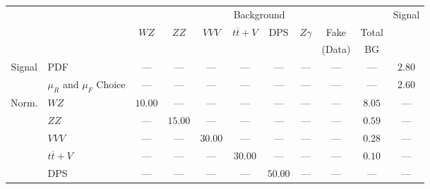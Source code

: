 \small\renewcommand{\tabcolsep}{4pt}
\begin{tabular}{|cl||ccccccc|c||c|}
\hline
 & & \multicolumn{8}{c||}{Background} & Signal \\ 
 & & $WZ$ & $ZZ$ & $VVV$ & $t\overline{t}+V$ & DPS & $Z\gamma$ & Fake & Total & \\ 
 & & &  &  &  &  &  & (Data) & BG & \\ 
\hline\hline
\multirow{2}{*}{Signal}
& PDF &  --- &  --- &  --- &  --- &  --- &  --- &  --- &  --- & $2.80$\\ 
\cline{2-11}
& $\mu_{R}$ and $\mu_{F}$ Choice &  --- &  --- &  --- &  --- &  --- &  --- &  --- &  --- & $2.60$\\ 
\hline
\multirow{5}{*}{Norm.}
& $WZ$ & $10.00$&  --- &  --- &  --- &  --- &  --- &  --- & $8.05$&  ---\\ 
\cline{2-11}
& $ZZ$ &  --- & $15.00$&  --- &  --- &  --- &  --- &  --- & $0.59$&  ---\\ 
\cline{2-11}
& $VVV$ &  --- &  --- & $30.00$&  --- &  --- &  --- &  --- & $0.28$&  ---\\ 
\cline{2-11}
& $t\overline{t}+V$ &  --- &  --- &  --- & $30.00$&  --- &  --- &  --- & $0.10$&  ---\\ 
\cline{2-11}
& DPS &  --- &  --- &  --- &  --- & $50.00$&  --- &  --- &  --- &  ---\\ 
\hline
\end{tabular}
